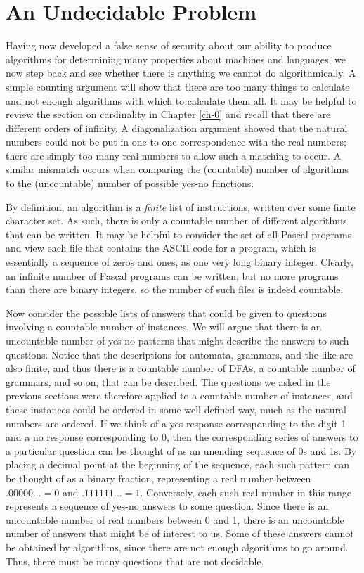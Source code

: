 \section{An Undecidable Problem}\label{sec-12.3}

Having now developed a false sense of security about our ability to produce
algorithms for determining many properties about machines and languages, we
now step back and see whether there is anything we cannot do algorithmically. A
simple counting argument will show that there are too many things to calculate
and not enough algorithms with which to calculate them all. It may be helpful to
review the section on cardinality in Chapter \ref{ch-0} and recall that there
are different orders of infinity. A diagonalization argument showed that the
natural numbers could not be put in one-to-one correspondence with the real
numbers; there are simply too many real numbers to allow such a matching to
occur. A similar mismatch occurs when comparing the (countable) number of
algorithms to the (uncountable) number of possible yes-no functions.

By definition, an algorithm is a \emph{finite} list of instructions, written
over some finite character set. As such, there is only a countable number of
different algorithms that can be written. It may be helpful to consider the set
of all Pascal programs and view each file that contains the ASCII code for a
program, which is essentially a sequence of zeros and ones, as one very long
binary integer. Clearly, an infinite number of Pascal programs can be written,
but no more programs than there are binary integers, so the number of such files
is indeed countable.

Now consider the possible lists of answers that could be given to questions
involving a countable number of instances. We will argue that there is an
uncountable number of yes-no patterns that might describe the answers to such
questions. Notice that the descriptions for automata, grammars, and the like
are also finite, and thus there is a countable number of DFAs, a countable
number of grammars, and so on, that can be described. The questions we asked in
the previous sections were therefore applied to a countable number of instances,
and these instances could be ordered in some well-defined way, much as the
natural numbers are ordered. If we think of a yes response corresponding to the
digit 1 and a no response corresponding to 0, then the corresponding series of
answers to a particular question can be thought of as an unending sequence of
0s and 1s. By placing a decimal point at the beginning of the sequence, each
such pattern can be thought of as a binary fraction, representing a real number
between $.00000\ldots=0$ and $.111111\ldots=1$. Conversely, each such real
number in this range represents a sequence of yes-no answers to some question.
Since there is an uncountable number of real numbers between 0 and 1, there is
an uncountable number of answers that might be of interest to us. Some of these
answers cannot be obtained by algorithms, since there are not enough algorithms
to go around. Thus, there must be many questions that are not decidable.

